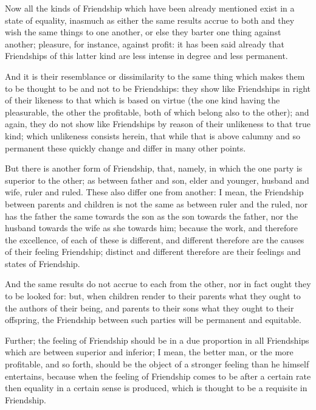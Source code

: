 
Now all the kinds of Friendship which have been already mentioned exist in a
state of equality, inasmuch as either the same results accrue to both and they
wish the same things to one another, or else they barter one thing against
another; pleasure, for instance, against profit: it has been said already that
Friendships of this latter kind are less intense in degree and less permanent.

And it is their resemblance or dissimilarity to the same thing which makes them
to be thought to be and not to be Friendships: they show like Friendships in
right of their likeness to that which is based on virtue (the one kind having
the pleasurable, the other the profitable, both of which belong also to the
other); and again, they do not show like Friendships by reason of their
unlikeness to that true kind; which unlikeness consists herein, that while that
is above calumny and so permanent these quickly change and differ in many other
points.

But there is another form of Friendship, that, namely, in which the one party
is superior to the other; as between father and son, elder and younger, husband
and wife, ruler and ruled. These also differ one from another: I mean, the
Friendship between parents and children is not the same as between ruler and
the ruled, nor has the father the same towards the son as the son towards the
father, nor the husband towards the wife as she towards him; because the work,
and therefore the excellence, of each of these is different, and different
therefore are the causes of their feeling Friendship; distinct and different
therefore are their feelings and states of Friendship.

And the same results do not accrue to each from the other, nor in fact ought
they to be looked for: but, when children render to their parents what they
ought to the authors of their being, and parents to their sons what they ought
to their offspring, the Friendship between such parties will be permanent and
equitable.

Further; the feeling of Friendship should be in a due proportion in all
Friendships which are between superior and inferior; I mean, the better man, or
the more profitable, and so forth, should be the object of a stronger feeling
than he himself entertains, because when the feeling of Friendship comes to be
after a certain rate then equality in a certain sense is produced, which is
thought to be a requisite in Friendship.

